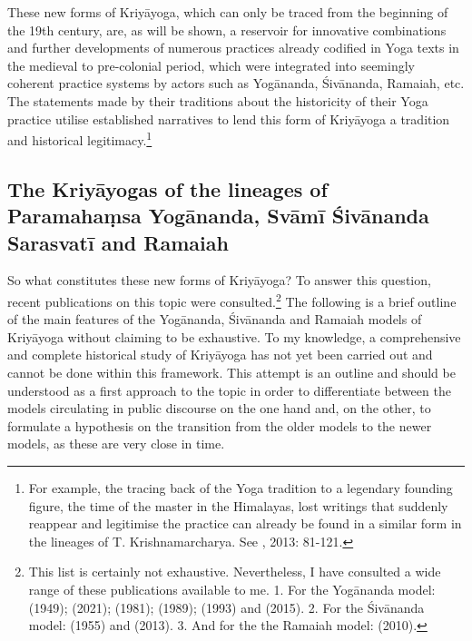 These new forms of Kriyāyoga, which can only be traced from the beginning of the 19th century, are, as will be shown, a reservoir for innovative combinations and further developments of numerous practices already codified in Yoga texts in the medieval to pre-colonial period, which were integrated into seemingly coherent practice systems by actors such as Yogānanda, Śivānanda, Ramaiah, etc. The statements made by their traditions about the historicity of their Yoga practice utilise established narratives to lend this form of Kriyāyoga a tradition and historical legitimacy.\footnote{For example, the tracing back of the Yoga tradition to a legendary founding figure, the time of the master in the Himalayas, lost writings that suddenly reappear and legitimise the practice can already be found in a similar form in the lineages of T. Krishnamarcharya. See \citeauthor{singleton2013gurus}, 2013: 81-121.}


\subsection{The Kriyāyogas of the lineages of Paramahaṃsa Yogānanda, Svāmī Śivānanda Sarasvatī and Ramaiah}

So what constitutes these new forms of Kriyāyoga? To answer this question, recent publications on this topic were consulted.\footnote{This list is certainly not exhaustive. Nevertheless, I have consulted a wide range of these publications available to me. 1. For the Yogānanda model: \citeauthor{autobioyogi} (1949); \citeauthor{kriyayogalowenstein} (2021); \citeauthor{kriyayogasarasvati1981} (1981); \citeauthor{hariharananda1989} (1989); \citeauthor{kriyayogaupanishad1993} (1993) and \citeauthor{kriyayogasturgess2015} (2015). 2. For the Śivānanda model: \citeauthor{shivanandakriya1982} (1955) and \citeauthor{kriyayoganityananda2013} (2013). 3. And for the the Ramaiah model: \citeauthor{govindan2010} (2010).} The following is a brief outline of the main features of the Yogānanda, Śivānanda and Ramaiah models of Kriyāyoga without claiming to be exhaustive. To my knowledge, a comprehensive and complete historical study of Kriyāyoga has not yet been carried out and cannot be done within this framework. This attempt is an outline and should be understood as a first approach to the topic in order to differentiate between the models circulating in public discourse on the one hand and, on the other, to formulate a hypothesis on the transition from the older models to the newer models, as these are very close in time.  


